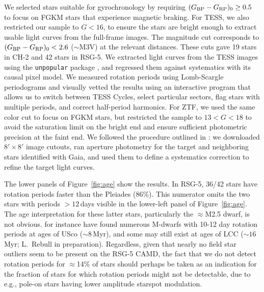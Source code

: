 \documentclass[12pt,twocolumn]{aastex63}
\newcommand{\bpmrpo}{(G_{\rm BP}-G_{\rm RP})_0}
\begin{document}
We selected stars suitable for gyrochronology by requiring $\bpmrpo
\geq 0.5$ to focus on FGKM stars that experience magnetic braking.
For TESS, we also restricted our sample to $G<16$, to ensure the stars
are bright enough to extract usable light curves from the full-frame
images.  The magnitude cut corresponds to $\bpmrpo < 2.6$
($\sim$M3V) at the relevant distances.  These cuts gave 19 stars in
CH-2 and 42 stars in RSG-5.  We extracted light curves from the TESS
images using the \texttt{unpopular} package
\citep{hattorio_2021_cpm}, and regressed them against systematics with
its causal pixel model.  We measured rotation periods using
Lomb-Scargle periodograms and visually vetted the results using an
interactive program that allows us to switch between TESS Cycles,
select particular sectors, flag stars with multiple periods, and
correct half-period harmonics. For ZTF, we used the same color cut to
focus on FGKM stars, but restricted the sample to $13 < G < 18$ to
avoid the saturation limit on the bright end and ensure sufficient
photometric precision at the faint end. We followed the procedure
outlined in \citet{curtis_rup147_2020}: we downloaded $8'\times8'$
image cutouts, ran aperture photometry for the target and neighboring
stars identified with Gaia, and used them to define a systematics
correction to refine the target light curves. 

The lower panels of Figure~\ref{fig:age} show the results.  In RSG-5,
36/42 stars have rotation periods faster than the Pleiades (86\%).
This numerator omits the two stars with periods $>$$12$\,days visible in
the lower-left panel of Figure~\ref{fig:age}.  The age interpretation
for these latter stars, particularly the $\approx$M2.5 dwarf, is not
obvious.  \citet{rebull_usco_2018} for instance have found numerous
M-dwarfs with 10-12 day rotation periods at ages of USco ($\sim$$8$\,Myr),
and some may still exist at ages of LCC ($\sim$$16$\,Myr;
L.~Rebull in preparation).  Regardless, given that nearly no field
star outliers seem to be present on the RSG-5 CAMD, the fact that we
do not detect rotation periods for $\approx$14\% of stars should
perhaps be taken as an indication for the fraction of stars for
which rotation periods might not be detectable, due to {e.g.}, pole-on
stars having lower amplitude starspot modulation.
\end{document}

